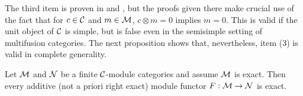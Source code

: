 \documentclass{amsart}
\begin{document}

The third item is proven in \cite[Prop. 3.11]{EO-ftc} and \cite[Prop 2.7.8]{EGNO}, but the proofs given there make crucial use of the fact that for $c \in \mathcal C$ and $m \in \mathcal M$, $c \otimes m = 0$ implies $m=0$. This is valid if the unit object of $\mathcal C$ is simple, but is false even in the semisimple setting of multifusion categories. The next proposition shows that, nevertheless, item (3) is valid in complete generality.  

\begin{proposition}\label{pro:Functors_automatically_exact}
	Let $\mathcal M$ and $\mathcal N$ be a finite $\mathcal C$-module categories and assume $\mathcal M$ is exact. Then every additive (not a priori right exact) module functor $F:\mathcal M \to \mathcal N$ is exact.   
\end{proposition}
\end{document}
